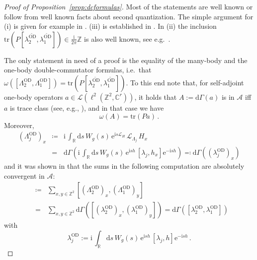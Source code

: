 \documentclass[a4paper]{article}
\newcommand{\tr}{\mathrm{tr}}
\newcommand{\e}{\mathrm{e}}
\renewcommand{\i}{\mathrm{i}}
\newcommand{\fd}{r}
\newcommand{\La}{\Lambda}
\newcommand{\w}{\omega}
\newcommand{\Z}{\mathbb{Z}}
\newcommand{\C}{\mathbb{C}}
\newcommand{\mA}{\mathcal{A}}
\newcommand{\R}{\mathbb{R}}
\newcommand{\OD}[1][]{   ^{\mathrm{OD}#1}   }
\newcommand{\ODT}[1][]{   ^{\widetilde{\mathrm{OD}}#1}   }
\newcommand{\mL}{\mathcal{L}}
\newcommand{\dd}{\mathrm{d}}
\theoremstyle{plain}
\theoremstyle{definition}
\theoremstyle{remark}
\renewcommand{\(}{\left(}
\renewcommand{\)}{\right)}
\begin{document}
 
\begin{proof}[Proof of  Proposition~\ref{prop:dcformulas}]
Most of the statements are well known or follow from well known facts about second quantization. The simple argument for (i) is given for example  in \cite{WMMMT24}. (iii) is established in \cite{TW2025}. In (ii) the inclusion $\tr (P [\lambda_2\ODT,\lambda_1\ODT]) \in \tfrac{\i}{2\pi} \Z$ is also well known, see e.g.\ \cite{avron1985quantization, rammal1990algebraic, bellissard1994noncommutative, aizenman1998localization, cornean2021beyond, cornean2025magnetic}.    

The only statement in need of a proof is the equality of the many-body and the one-body double-commutator formulas, i.e.\ that 
$\w([\Lambda_2\OD,\Lambda_1\OD]) = \tr (P [\lambda_2\ODT,\lambda_1\ODT])$.
To this end note that, for self-adjoint one-body operators $a\in\mL(\ell^2(\Z^2,\C^\fd))$, 
it holds that  $A:=\dd\Gamma(a)$ is in $\mA$ iff $a$ is trace class (see, e.g., \cite{Lundberg}), and in  that case  we have
\[
\w(A) = \tr(P a)\,.
\]
Moreover,
\begin{eqnarray*}
    (\Lambda_j\OD)_x 
    &\coloneq &
    \i \,  \int_{\R}\dd s \, W_g(s)\, \e^{\i s \mL_H} \,  \mL_{\La_j}  \, H_x 
    \\
    &=&
    \dd\Gamma\left(  \i \,  \int_{\R}\dd s \, W_g(s)\, \e^{\i s h} \,  [\lambda_j, h_x]\e^{-\i s h}\right)
    \eqcolon 
    \dd\Gamma((\lambda_j\OD)_x)    
\end{eqnarray*}
and
it was shown in \cite{TW2025} that the sums in the following computation are absolutely convergent in $\mA$:
\begin{eqnarray*}
    [\Lambda_2\OD,\La_1\OD] 
    &\coloneq &
    \sum_{x,y\in\Z^2} [(\Lambda_2\OD)_x,(\Lambda_1\OD)_y]
    \\
    &=&
    \sum_{x,y\in\Z^2}\dd\Gamma([(\lambda_2\OD)_x, (\lambda_1\OD)_y] )
    =
    \dd\Gamma([\lambda_2\OD,\lambda_1\OD])    
\end{eqnarray*}
with 
\begin{equation} \label{lambdajOD}
\lambda_j\OD :=  \i \,  \int_{\R}\dd s \, W_g(s)\, \e^{\i s h} \,  [\lambda_j, h]\e^{-\i s h}\,.
\end{equation}


\end{proof}
\end{document}
